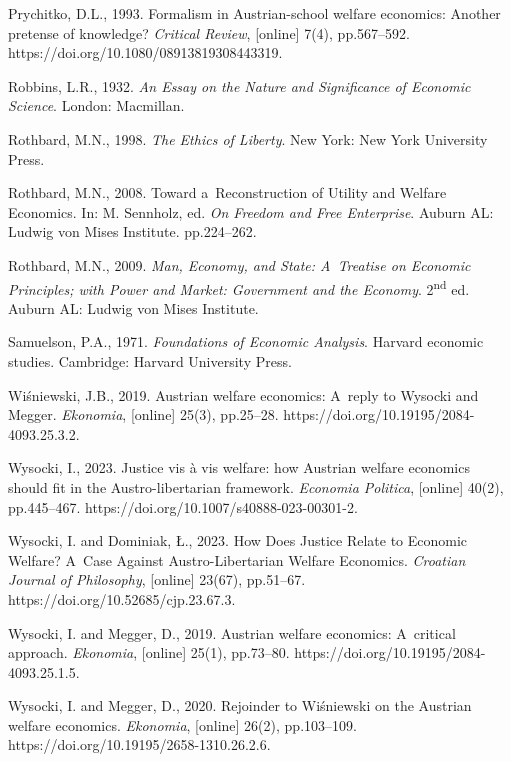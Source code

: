 Prychitko, D.L., 1993. Formalism in Austrian-school welfare economics: Another pretense of knowledge? \textit{Critical Review}, [online] 7(4), pp.567–592. https://doi.org/10.1080/08913819308443319.



Robbins, L.R., 1932. \textit{An Essay on the Nature and Significance of Economic Science}. London: Macmillan.



Rothbard, M.N., 1998. \textit{The Ethics of Liberty}. New York: New York University Press.



Rothbard, M.N., 2008. Toward a~Reconstruction of Utility and Welfare Economics. In: M. Sennholz, ed. \textit{On Freedom and Free Enterprise}. Auburn AL: Ludwig von Mises Institute. pp.224–262.



Rothbard, M.N., 2009. \textit{Man, Economy, and State: A~Treatise on Economic Principles; with Power and Market: Government and the Economy}. 2\textsuperscript{nd} ed. Auburn AL: Ludwig von Mises Institute.



Samuelson, P.A., 1971. \textit{Foundations of Economic Analysis}. Harvard economic studies. Cambridge: Harvard University Press.



Wiśniewski, J.B., 2019. Austrian welfare economics: A~reply to Wysocki and Megger. \textit{Ekonomia}, [online] 25(3), pp.25–28. https://doi.org/10.19195/2084-4093.25.3.2.



Wysocki, I., 2023. Justice vis à vis welfare: how Austrian welfare economics should fit in the Austro-libertarian framework. \textit{Economia Politica}, [online] 40(2), pp.445–467. https://doi.org/10.1007/s40888-023-00301-2.



Wysocki, I. and Dominiak, Ł., 2023. How Does Justice Relate to Economic Welfare? A~Case Against Austro-Libertarian Welfare Economics. \textit{Croatian Journal of Philosophy}, [online] 23(67), pp.51–67. https://doi.org/10.52685/cjp.23.67.3.



Wysocki, I. and Megger, D., 2019. Austrian welfare economics: A~critical approach. \textit{Ekonomia}, [online] 25(1), pp.73–80. https://doi.org/10.19195/2084-4093.25.1.5.



Wysocki, I. and Megger, D., 2020. Rejoinder to Wiśniewski on the Austrian welfare economics. \textit{Ekonomia}, [online] 26(2), pp.103–109. https://doi.org/10.19195/2658-1310.26.2.6.



